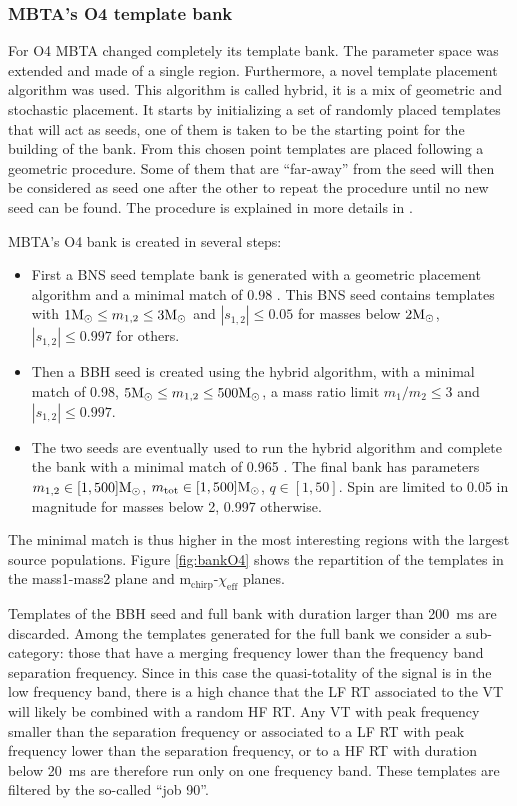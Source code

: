 \subsubsection{MBTA's O4 template bank}
\label{sec:bankO4}

For O4 MBTA changed completely its template bank.
The parameter space was extended and made of a single region.
Furthermore, a novel template placement algorithm was used.
This algorithm is called hybrid, it is a mix of geometric and stochastic placement.
It starts by initializing a set of randomly placed templates that will act as seeds, one of them is taken to be the starting point for the building of the bank.
From this chosen point templates are placed following a geometric procedure.
Some of them that are ``far-away'' from the seed will then be considered as seed one after the other to repeat the procedure until no new seed can be found.
The procedure is explained in more details in \cite{hybrid1,hybrid2}.

MBTA's O4 bank is created in several steps:
\begin{itemize}
\item First a BNS seed template bank is generated with a geometric placement algorithm and a minimal match of 0.98 .
This BNS seed contains templates with $1 \textrm{M$_{\odot}$} \leq m_{1,2} \leq 3 \textrm{M$_{\odot}$}$ and $|s_{1,2}|\leq 0.05$ for masses below $2 \textrm{M$_{\odot}$}$, $|s_{1,2}| \leq 0.997$ for others.
\item Then a BBH seed is created using the hybrid algorithm, with a minimal match of 0.98, $5 \textrm{M$_{\odot}$} \leq m_{1,2} \leq 500 \textrm{M$_{\odot}$}$, a mass ratio limit $m_1/m_2 \leq 3$ and $|s_{1,2}| \leq 0.997$.
\item The two seeds are eventually used to run the hybrid algorithm and complete the bank with a minimal match of 0.965 .
  The final bank has parameters $m_{1,2} \in [1,500]\textrm{M$_{\odot}$}$, $m_{\text{tot}} \in [1,500]\textrm{M$_{\odot}$}$, $q \in [1,50]$.
  Spin are limited to 0.05 in magnitude for masses below 2\msun, 0.997 otherwise.
\end{itemize}
The minimal match is thus higher in the most interesting regions with the largest source populations.
Figure \ref{fig:bankO4} shows the repartition of the templates in the mass1-mass2 plane and m$_{\text{chirp}}$-$\chi_{\text{eff}}$ planes.

Templates of the BBH seed and full bank with duration larger than \SI{200}{ms} are discarded.
Among the templates generated for the full bank we consider a sub-category: those that have a merging frequency lower than the frequency band separation frequency.
Since in this case the quasi-totality of the signal is in the low frequency band, there is a high chance that the LF RT associated to the VT will likely be combined with a random HF RT.
Any VT with peak frequency smaller than the separation frequency or associated to a LF RT with peak frequency lower than the separation frequency, or to a HF RT with duration below \SI{20}{ms} are therefore run only on one frequency band.
These templates are filtered by the so-called ``job 90''.

